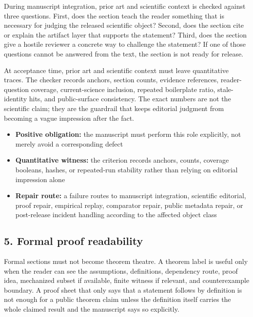 During manuscript integration, prior art and scientific context is checked against three questions. First, does the section teach the reader something that is necessary for judging the released scientific object? Second, does the section cite or explain the artifact layer that supports the statement? Third, does the section give a hostile reviewer a concrete way to challenge the statement? If one of those questions cannot be answered from the text, the section is not ready for release.


At acceptance time, prior art and scientific context must leave quantitative traces. The checker records anchors, section counts, evidence references, reader-question coverage, current-science inclusion, repeated boilerplate ratio, stale-identity hits, and public-surface consistency. The exact numbers are not the scientific claim; they are the guardrail that keeps editorial judgment from becoming a vague impression after the fact.


\begin{itemize}[leftmargin=1.8em]

\item \textbf{Positive obligation:} the manuscript must perform this role explicitly, not merely avoid a corresponding defect

\item \textbf{Quantitative witness:} the criterion records anchors, counts, coverage booleans, hashes, or repeated-run stability rather than relying on editorial impression alone

\item \textbf{Repair route:} a failure routes to manuscript integration, scientific editorial, proof repair, empirical replay, comparator repair, public metadata repair, or post-release incident handling according to the affected object class

\end{itemize}

\subsection{5. Formal proof readability}

Formal sections must not become theorem theatre. A theorem label is useful only when the reader can see the assumptions, definitions, dependency route, proof idea, mechanized subset if available, finite witness if relevant, and counterexample boundary. A proof sheet that only says that a statement follows by definition is not enough for a public theorem claim unless the definition itself carries the whole claimed result and the manuscript says so explicitly.


